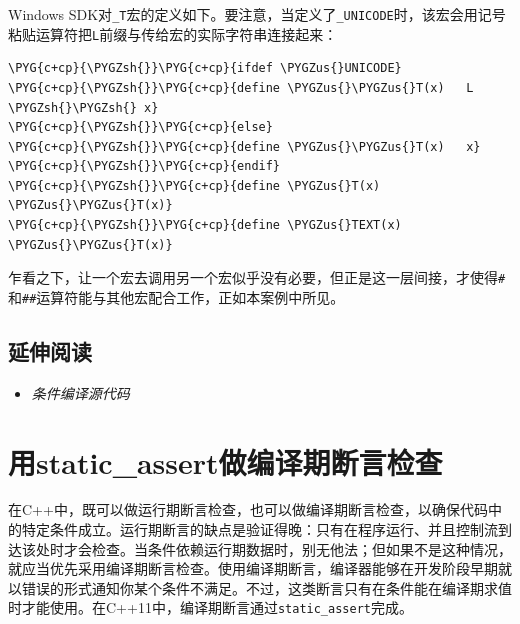 
Windows SDK对\texttt{\_\allowbreak{}T}宏的定义如下。要注意，当定义了\texttt{\_\allowbreak{}UNICODE}时，该宏会用记号粘贴运算符把\texttt{L}前缀与传给宏的实际字符串连接起来：



\begin{codeblockbg}
\begin{Verbatim}[commandchars=\\\{\},breaklines=true,breakanywhere=true,fontsize=\codefont,xleftmargin=17bp]
\PYG{c+cp}{\PYGZsh{}}\PYG{c+cp}{ifdef \PYGZus{}UNICODE}
\PYG{c+cp}{\PYGZsh{}}\PYG{c+cp}{define \PYGZus{}\PYGZus{}T(x)   L \PYGZsh{}\PYGZsh{} x}
\PYG{c+cp}{\PYGZsh{}}\PYG{c+cp}{else}
\PYG{c+cp}{\PYGZsh{}}\PYG{c+cp}{define \PYGZus{}\PYGZus{}T(x)   x}
\PYG{c+cp}{\PYGZsh{}}\PYG{c+cp}{endif}
\PYG{c+cp}{\PYGZsh{}}\PYG{c+cp}{define \PYGZus{}T(x)    \PYGZus{}\PYGZus{}T(x)}
\PYG{c+cp}{\PYGZsh{}}\PYG{c+cp}{define \PYGZus{}TEXT(x) \PYGZus{}\PYGZus{}T(x)}
\end{Verbatim}
\end{codeblockbg}



乍看之下，让一个宏去调用另一个宏似乎没有必要，但正是这一层间接，才使得\texttt{\#}和\texttt{\#\#}运算符能与其他宏配合工作，正如本案例中所见。



\subsection{延伸阅读}



\begin{itemize}
\item \textit{条件编译源代码}

\end{itemize}



\section{用static\_assert做编译期断言检查}



在C++中，既可以做运行期断言检查，也可以做编译期断言检查，以确保代码中的特定条件成立。运行期断言的缺点是验证得晚：只有在程序运行、并且控制流到达该处时才会检查。当条件依赖运行期数据时，别无他法；但如果不是这种情况，就应当优先采用编译期断言检查。使用编译期断言，编译器能够在开发阶段早期就以错误的形式通知你某个条件不满足。不过，这类断言只有在条件能在编译期求值时才能使用。在C++11中，编译期断言通过\texttt{static\_\allowbreak{}assert}完成。


